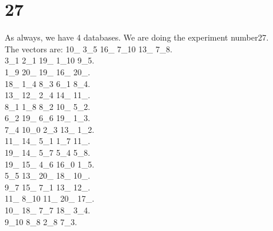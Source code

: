 \chapter{27}
\indent As always, we have 4 databases. We are doing the experiment number27.\\
The vectors are:
10\_ 3\_5 16\_ 7\_10 13\_ 7\_8.\\3\_1 2\_1 19\_ 1\_10 9\_5.\\1\_9 20\_ 19\_ 16\_ 20\_.\\18\_ 1\_4 8\_3 6\_1 8\_4.\\13\_ 12\_ 2\_4 14\_ 11\_.\\8\_1 1\_8 8\_2 10\_ 5\_2.\\6\_2 19\_ 6\_6 19\_ 1\_3.\\7\_4 10\_0 2\_3 13\_ 1\_2.\\11\_ 14\_ 5\_1 1\_7 11\_.\\19\_ 14\_ 5\_7 5\_4 5\_8.\\19\_ 15\_ 4\_6 16\_0 1\_5.\\5\_5 13\_ 20\_ 18\_ 10\_.\\9\_7 15\_ 7\_1 13\_ 12\_.\\11\_ 8\_10 11\_ 20\_ 17\_.\\10\_ 18\_ 7\_7 18\_ 3\_4.\\9\_10 8\_8 2\_8 7\_3.\\